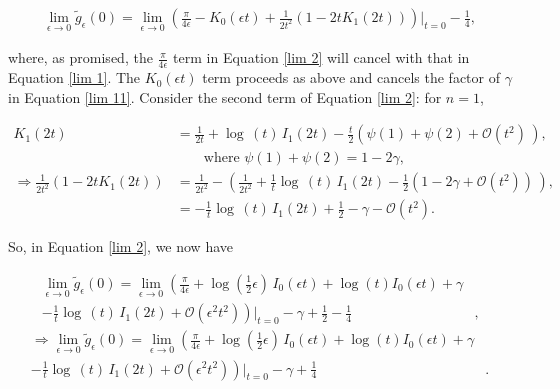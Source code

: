 \documentclass{article}
\numberwithin{equation}{section} %
\begin{document}
\begin{equation}
\begin{split}
\lim_{\epsilon \rightarrow 0}\tilde{g}_\epsilon(0) = \lim_{\epsilon \rightarrow 0} \left( \frac{\pi}{4\epsilon} - K_0(\epsilon t) + \frac{1}{2t^2}(1-2tK_1(2t)) \right)\bigg\vert_{t=0} - \frac{1}{4},
\end{split}
\label{lim 2}
\end{equation}

\noindent where, as promised, the $\frac{\pi}{4\epsilon}$ term in Equation \ref{lim 2} will cancel with that in Equation \ref{lim 1}. The $K_0(\epsilon t)$ term proceeds as above and cancels the factor of $\gamma$ in Equation \ref{lim 11}. Consider the second term of Equation \ref{lim 2}: for $n=1$,

\begin{equation}
\begin{split}
K_1(2t) &= \frac{1}{2t} + \log\,(t) \,I_1(2t)  - \frac{t}{2}\left(\psi(1) + \psi(2) + \mathcal{O}(t^2)\, \right),\\
& \quad \quad \mathrm{where \,} \,\psi(1) + \psi(2) = 1-2\gamma,\\
\Rightarrow \frac{1}{2t^2} ( 1 - 2t K_1(2t)) &= \frac{1}{2t^2} - \left( \frac{1}{2t^2} + \frac{1}{t} \log\,(t) \,I_1(2t)  - \frac{1}{2}(1-2\gamma + \mathcal{O}(t^2))\,\right),\\
&= -\frac{1}{t} \log\,(t) \,I_1(2t)  + \frac{1}{2} - \gamma - \mathcal{O}(t^2).
\end{split}
\end{equation}

So, in Equation \ref{lim 2}, we now have

\begin{equation*}
\begin{split}
\lim_{\epsilon \rightarrow 0}\tilde{g}_\epsilon(0) = \lim_{\epsilon \rightarrow 0} \left( \frac{\pi}{4\epsilon} + \log(\frac{1}{2}\epsilon)\, I_0(\epsilon t) + \log(t)I_0(\epsilon t) + \gamma \right.&\\
\left. - \frac{1}{t} \log\,(t) \,I_1(2t) + \mathcal{O}(\epsilon^2t^2) \right)\bigg\vert_{t=0} -\gamma + \frac{1}{2} - \frac{1}{4}&,
\end{split}
\end{equation*}
\begin{equation}
\begin{split}
\Rightarrow \lim_{\epsilon \rightarrow 0}\tilde{g}_\epsilon(0) = \lim_{\epsilon \rightarrow 0} \left( \frac{\pi}{4\epsilon} + \log(\frac{1}{2}\epsilon)\, I_0(\epsilon t) + \log(t)I_0(\epsilon t) + \gamma \right.&\\
\left. - \frac{1}{t} \log\,(t) \,I_1(2t) + \mathcal{O}(\epsilon^2t^2) \right)\bigg\vert_{t=0} -\gamma + \frac{1}{4}&.
\end{split}
\label{lim 21}
\end{equation}
\end{document}
